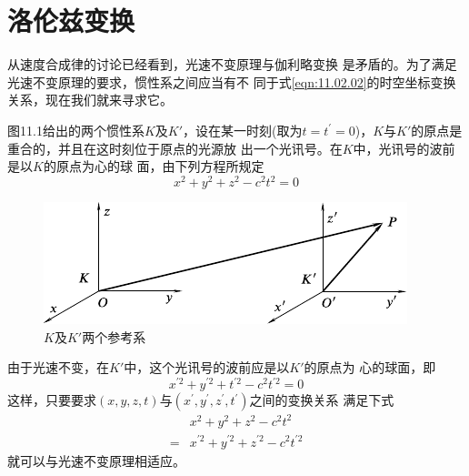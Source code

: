\section{洛伦兹变换}\label{sec:11.04}

从速度合成律的讨论已经看到，光速不变原理与伽利略变换
是矛盾的。为了满足光速不变原理的要求，惯性系之间应当有不
同于式\eqref{eqn:11.02.02}的时空坐标变换关系，现在我们就来寻求它。

图11.1给出的两个惯性系$ K $及$ K' $，设在某一时刻(取为$ t = t ^ { \prime }
  =0 $)，$ K $与$ K' $的原点是重合的，并且在这时刻位于原点的光源放
出一个光讯号。在$ K $中，光讯号的波前是以$ K $的原点为心的球
面，由下列方程所规定
\begin{equation*}
  x ^ { 2 } + y ^ { 2 } + z ^ { 2 } - c ^ { 2 } t ^ { 2 } = 0
\end{equation*}

\begin{figure}[h]
  \centering
  \includegraphics{figure/fig11.01}
  \caption{$ K $及$ K' $两个参考系}
  \label{fig:11.01}
\end{figure}
由于光速不变，在$ K' $中，这个光讯号的波前应是以$ K' $的原点为
心的球面，即
\begin{equation*}
  x ^ { \prime 2 } + y ^ { \prime 2 } + t ^ { \prime 2 } - c ^ { 2 } t ^ { \prime 2 } = 0
\end{equation*}
这样，只要要求$ \left( x , y , z , t \right) $与$ \left( x ^ { \prime } , y ^ { \prime } , z ^ { \prime } , t ^ { \prime } \right) $之间的变换关系
满足下式\vspace{-1.4em}
\begin{equation}\label{eqn:11.04.01}
  \begin{split}
    &x ^ { 2 } + y ^ { 2 } + z ^ { 2 } - c ^ { 2 } t ^ { 2 } \\[-0.3em]
    = &x ^ { \prime 2 } + y ^ { \prime 2 } + z ^ { \prime 2 } - c ^ { 2 } t ^ { \prime 2 }
  \end{split}
\end{equation}
就可以与光速不变原理相适应。

